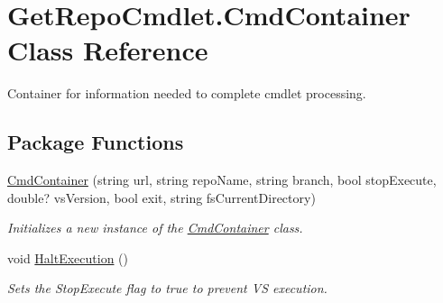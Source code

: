 \hypertarget{class_get_repo_cmdlet_1_1_cmd_container}{}\section{Get\+Repo\+Cmdlet.\+Cmd\+Container Class Reference}
\label{class_get_repo_cmdlet_1_1_cmd_container}


Container for information needed to complete cmdlet processing.  


\subsection*{Package Functions}
\begin{DoxyCompactItemize}
\item 
\mbox{\hyperlink{class_get_repo_cmdlet_1_1_cmd_container_aad0056fff2ee68ae46f84ec17e31cf01}{Cmd\+Container}} (string url, string repo\+Name, string branch, bool stop\+Execute, double? vs\+Version, bool exit, string fs\+Current\+Directory)
\begin{DoxyCompactList}\small\item\em Initializes a new instance of the \mbox{\hyperlink{class_get_repo_cmdlet_1_1_cmd_container}{Cmd\+Container}} class. \end{DoxyCompactList}\item 
void \mbox{\hyperlink{class_get_repo_cmdlet_1_1_cmd_container_ab104ae079cf2c2c4efd7a13bb38ae6b1}{Halt\+Execution}} ()
\begin{DoxyCompactList}\small\item\em Sets the Stop\+Execute flag to {\ttfamily true} to prevent VS execution. \end{DoxyCompactList}\end{DoxyCompactItemize}
